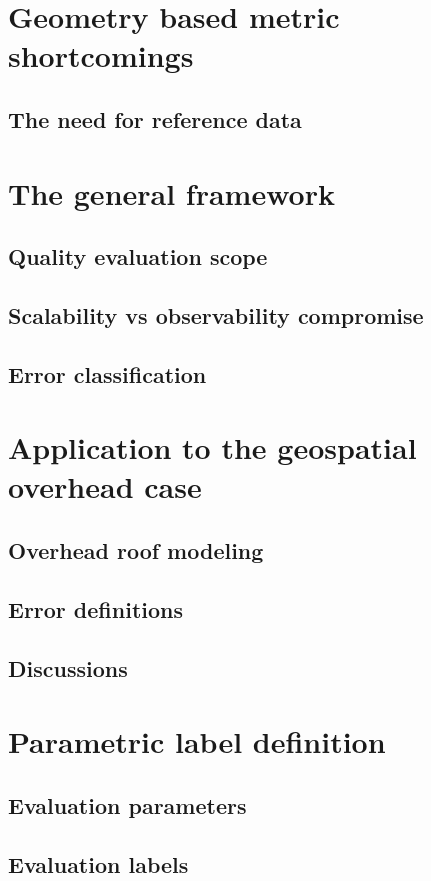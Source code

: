 \minitoc
\section{Geometry based metric shortcomings}
    \subsection{The need for reference data}
    
\section{The general framework}
    \subsection{Quality evaluation scope}
    \subsection{Scalability vs observability compromise}
    \subsection{Error classification}
\section{Application to the geospatial overhead case}
    \subsection{Overhead roof modeling}
    \subsection{Error definitions}
    \subsection{Discussions}
\section{Parametric label definition}
    \subsection{Evaluation parameters}
    \subsection{Evaluation labels}
